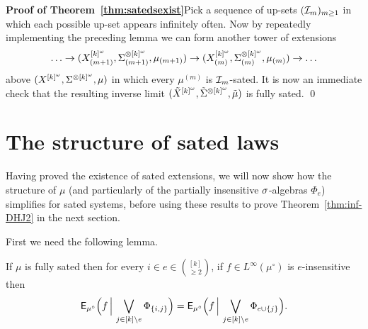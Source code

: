 \documentclass[11pt]{article}
\begin{document}
\textbf{Proof of Theorem~\ref{thm:satedsexist}}\quad Pick a sequence
of up-sets $(\mathcal{I}_m)_{m\geq 1}$ in which each possible up-set appears
infinitely often. Now by repeatedly implementing the preceding lemma
we can form another tower of extensions
\[\ldots\to(X_{(m+1)}^{[k]^\omega},\Sigma^{\otimes [k]^\omega}_{(m+1)},\mu_{(m+1)})\to (X^{[k]^\omega}_{(m)},\Sigma^{\otimes [k]^\omega}_{(m)},\mu_{(m)})\to\ldots\]
above $(X^{[k]^\omega},\Sigma^{\otimes [k]^\omega},\mu)$ in which every
$\mu^{(m)}$ is $\mathcal{I}_m$-sated.  It is now an immediate check that the
resulting inverse limit $(\tilde{X}^{[k]^\omega},\tilde{\Sigma}^{\otimes
[k]^\omega},\tilde{\mu})$ is fully sated. \qed

\section{The structure of sated laws}

Having proved the existence of sated extensions, we will now show
how the structure of $\mu$ (and particularly of the partially
insensitive $\sigma$-algebras $\Phi_e$) simplifies for sated systems,
before using these results to prove Theorem~\ref{thm:inf-DHJ2} in
the next section.

First we need the following lemma.

\begin{lem}\label{lem:isotropized}
If $\mu$ is fully sated then for every $i\in e \in \binom{[k]}{\geq
2}$, if $f \in L^\infty(\mu^\circ)$ is $e$-insensitive then
\[\mathsf{E}_{\mu^\circ}\Big(f\,\Big|\,\bigvee_{j\in[k]\setminus e}\Phi_{\{i,j\}}\Big) = \mathsf{E}_{\mu^\circ}\Big(f\,\Big|\,\bigvee_{j\in[k]\setminus e}\Phi_{e\cup\{j\}}\Big).\]
\end{lem}
\end{document}
